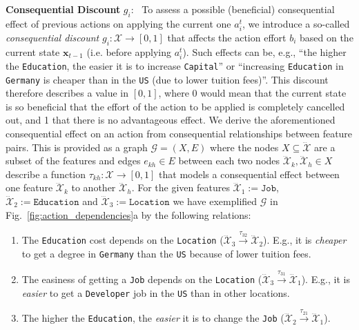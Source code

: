\documentclass[runningheads, envcountsame, a4paper]{llncs}
\newcommand{\action}{a}
\newcommand{\state}{\mathbf{x}}
\newcommand{\featurespace}{\mathcal{X}}
\newcommand{\feature}{\dddot{\featurespace}}
\newcommand{\transition}{\tau}
\newcommand{\dependencyGraph}{\mathcal{G}}
\newcommand{\consequentialCosts}{g}
\newcommand{\baseCosts}{b}
\begin{document}
\textbf{Consequential Discount} $\consequentialCosts_i$: \,
To assess a possible (beneficial) consequential effect of previous actions on applying the current one $\action^t_i$, we introduce a so-called \emph{consequential discount} $\consequentialCosts_i: \featurespace \to [0,1]$ that affects the action effort $\baseCosts_i$ based on the current state $\state_{t-1}$ (i.e. before applying $\action^t_i$). Such effects can be, e.g., \enquote{the higher the \texttt{Education}, the easier it is to increase \texttt{Capital}} or \enquote{increasing \texttt{Education} in \texttt{Germany} is cheaper than in the \texttt{US} (due to lower tuition fees)}.
This discount therefore describes a value in $[0,1]$, where 0 would mean that the current state is so beneficial that the effort of the action to be applied is completely cancelled out, and 1 that there is no advantageous effect.
We derive the aforementioned consequential effect on an action from consequential relationships between feature pairs. This is provided as a graph $\dependencyGraph = (X,E)$ where the nodes $X \subseteq \feature$ are a subset of the features and edges $e_{kh} \in E$ between each two nodes $\feature_k, \feature_h \in X$ describe a function $\transition_{kh}: \featurespace \to [0,1]$ that models a consequential effect between one feature $\feature_k$ to another $\feature_h$. For the given features $\feature_1:=\texttt{Job}$, $\feature_2:=\texttt{Education}$ and $\feature_3:=\texttt{Location}$ we have exemplified $\dependencyGraph$ in Fig.~\ref{fig:action_dependencies}a by the following relations:
\begin{enumerate}
    \item The \texttt{Education} cost depends on the \texttt{Location} ($\feature_3 \xrightarrow{\transition_{32}} \feature_2$). E.g., it is \emph{cheaper} to get a degree in \texttt{Germany} than the \texttt{US} because of lower tuition fees.
    \item The easiness of getting a \texttt{Job} depends on the \texttt{Location} ($\feature_3 \xrightarrow{\transition_{31}} \feature_1$). E.g., it is \emph{easier} to get a \texttt{Developer} job in the \texttt{US} than in other locations.
    \item The higher the \texttt{Education}, the \emph{easier} it is to change the \texttt{Job} ($\feature_2 \xrightarrow{\transition_{21}} \feature_1$).
\end{enumerate}
%
\end{document}
